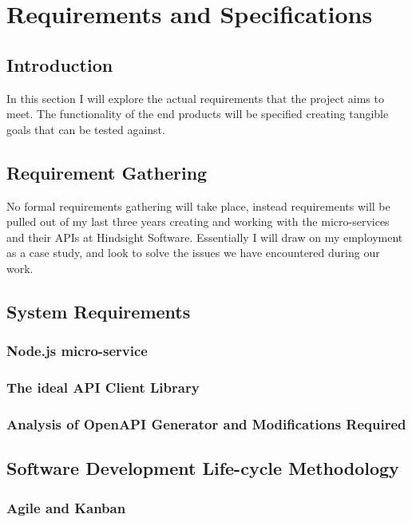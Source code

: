 \chapter{Requirements and Specifications}

\section{Introduction}
In this section I will explore the actual requirements that the project aims to meet. The functionality of the end products will be specified creating tangible goals that can be tested against.
\section{Requirement Gathering}
No formal requirements gathering will take place, instead requirements will be pulled out of my last three years creating and working with the micro-services and their APIs at Hindsight Software. Essentially I will draw on my employment as a case study, and look to solve the issues we have encountered during our work.
\section{System Requirements}
\subsection{Node.js micro-service}
\subsection{The ideal API Client Library}
\subsection{Analysis of OpenAPI Generator and Modifications Required}
\section{Software Development Life-cycle Methodology}
\subsection{Agile and Kanban}